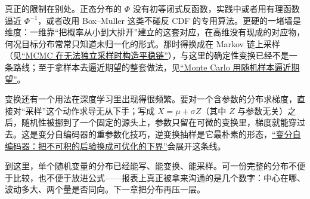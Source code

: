 真正的限制在别处。正态分布的 \(\Phi\) 没有初等闭式反函数，实践中或者用有理函数逼近 \(\Phi^{-1}\)，或者改用 Box--Muller 这类不碰反 CDF 的专用算法。更硬的一堵墙是维度：一维靠``把概率从小到大排开''建立的这套对应，在高维没有现成的对应物，何况目标分布常常只知道未归一化的形式。那时得换成在 Markov 链上采样（见\hyperref[sec:13-Machine-Learning/08-Sampling-and-Inference/02]{``MCMC 在无法独立采样时构造平稳链''}），与这里的确定性变换已经不是一条路线；至于拿样本去逼近期望的整套做法，见\hyperref[sec:13-Machine-Learning/08-Sampling-and-Inference/01]{``Monte Carlo 用随机样本逼近期望''}。

变换还有一个用法在深度学习里出现得很频繁。要对一个含参数的分布求梯度，直接对``采样''这个动作求导无从下手；写成 \(X=\mu+\sigma Z\)（其中 \(Z\) 与参数无关）之后，随机性被挪到了一个固定的源头上，参数只留在可微的变换里，梯度就能穿过去。这是变分自编码器的重参数化技巧，逆变换抽样是它最朴素的形态，\hyperref[ch:128]{``变分自编码器：把不可积的后验换成可优化的下界''}会展开这条线。

到这里，单个随机变量的分布已经能写、能变换、能采样。可一份完整的分布不便于比较，也不便于放进公式——报表上真正被拿来沟通的是几个数字：中心在哪、波动多大、两个量是否同向。下一章把分布再压一层。
